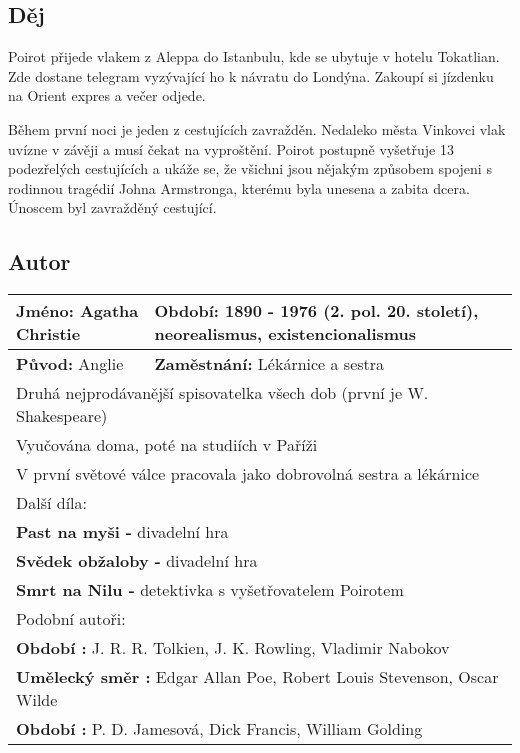 \subsection*{Děj}
Poirot přijede vlakem z Aleppa do Istanbulu, kde se ubytuje v hotelu Tokatlian.
Zde dostane telegram vyzývající ho k návratu do Londýna.
Zakoupí si jízdenku na Orient expres a večer odjede.

Během první noci je jeden z cestujících zavražděn.
Nedaleko města Vinkovci vlak uvízne v závěji a musí čekat na vyproštění.
Poirot postupně vyšetřuje 13 podezřelých cestujících a ukáže se, že všichni jsou nějakým způsobem spojeni s rodinnou tragédií Johna Armstronga, kterému byla unesena a zabita dcera.
Únoscem byl zavražděný cestující.

\subsection*{Autor}
\begin{tabularx}{\linewidth}{l|l}
  \textbf{Jméno:} Agatha Christie & \textbf{Období:} 1890 - 1976 (2. pol. 20. století), neorealismus, existencionalismus \\
  \hline
  \textbf{Původ:} Anglie          & \textbf{Zaměstnání:} Lékárnice a sestra                                              \\
  \hline
  \multicolumn{2}{l}{Druhá nejprodávanější spisovatelka všech dob (první je W. Shakespeare)}                             \\
  \multicolumn{2}{l}{Vyučována doma, poté na studiích v Paříži}                                                          \\
  \multicolumn{2}{l}{V první světové válce pracovala jako dobrovolná sestra a lékárnice}                                 \\
  \hline
  \multicolumn{2}{l}{Další díla:}                                                                                        \\
  \multicolumn{2}{l}{\textbf{Past na myši -} divadelní hra}                                                              \\
  \multicolumn{2}{l}{\textbf{Svědek obžaloby -} divadelní hra}                                                           \\
  \multicolumn{2}{l}{\textbf{Smrt na Nilu -} detektivka s vyšetřovatelem Poirotem}                                       \\
  \hline
  \multicolumn{2}{l}{Podobní autoři:}                                                                                    \\
  \multicolumn{2}{l}{\textbf{Období :} J. R. R. Tolkien, J. K. Rowling, Vladimir Nabokov}                                \\
  \multicolumn{2}{l}{\textbf{Umělecký směr :} Edgar Allan Poe, Robert Louis Stevenson, Oscar Wilde}                      \\
  \multicolumn{2}{l}{\textbf{Období :} P. D. Jamesová, Dick Francis, William Golding}                                    \\
\end{tabularx}
